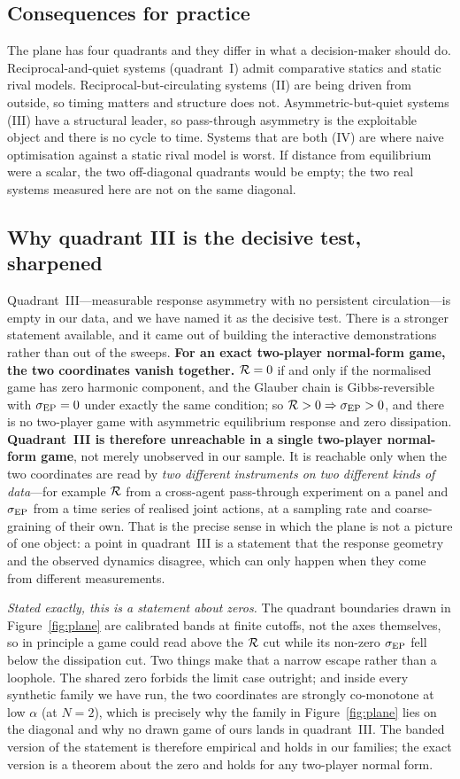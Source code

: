 \subsection{Consequences for practice}
The plane has four quadrants and they differ in what a decision-maker should do.
Reciprocal-and-quiet systems (quadrant~I) admit comparative statics and static rival models.
Reciprocal-but-circulating systems (II) are being driven from outside, so timing matters and
structure does not. Asymmetric-but-quiet systems (III) have a structural leader, so
pass-through asymmetry is the exploitable object and there is no cycle to time. Systems that
are both (IV) are where naive optimisation against a static rival model is worst. If distance
from equilibrium were a scalar, the two off-diagonal quadrants would be empty; the two real
systems measured here are not on the same diagonal.

\subsection{Why quadrant III is the decisive test, sharpened}
\label{sec:q3}
Quadrant~III---measurable response asymmetry with no persistent circulation---is empty in
our data, and we have named it as the decisive test. There is a stronger statement available,
and it came out of building the interactive demonstrations rather than out of the sweeps.
\textbf{For an exact two-player normal-form game, the two coordinates vanish
together.} $\mathcal{R}=0$ if and only if the normalised game has zero harmonic component, and the
Glauber chain is Gibbs-reversible with $\sigma_{\mathrm{EP}}=0$ under exactly the same condition; so
$\mathcal{R}>0\Rightarrow\sigma_{\mathrm{EP}}>0$, and there is no two-player game with asymmetric equilibrium
response and zero dissipation. \textbf{Quadrant~III is therefore unreachable in a single
two-player normal-form game}, not merely unobserved in our sample. It is reachable only when
the two coordinates are read by \emph{two different instruments on two different kinds of
data}---for example $\mathcal{R}$ from a cross-agent pass-through experiment on a panel and $\sigma_{\mathrm{EP}}$
from a time series of realised joint actions, at a sampling rate and coarse-graining of
their own. That is the precise sense in which the plane is not a picture of one object: a
point in quadrant~III is a statement that the response geometry and the observed dynamics
disagree, which can only happen when they come from different measurements.

\emph{Stated exactly, this is a statement about zeros.} The quadrant boundaries drawn in
Figure~\ref{fig:plane} are calibrated bands at finite cutoffs, not the axes themselves, so
in principle a game could read above the $\mathcal{R}$ cut while its non-zero $\sigma_{\mathrm{EP}}$ fell below the
dissipation cut. Two things make that a narrow escape rather than a loophole. The shared
zero forbids the limit case outright; and inside every synthetic family we have run, the two
coordinates are strongly co-monotone at low $\alpha$ (at $N=2$), which is precisely why the
family in Figure~\ref{fig:plane} lies on the diagonal and why no drawn game of ours lands in
quadrant~III. The banded version of the statement is therefore empirical and holds in our
families; the exact version is a theorem about the zero and holds for any two-player normal
form.

